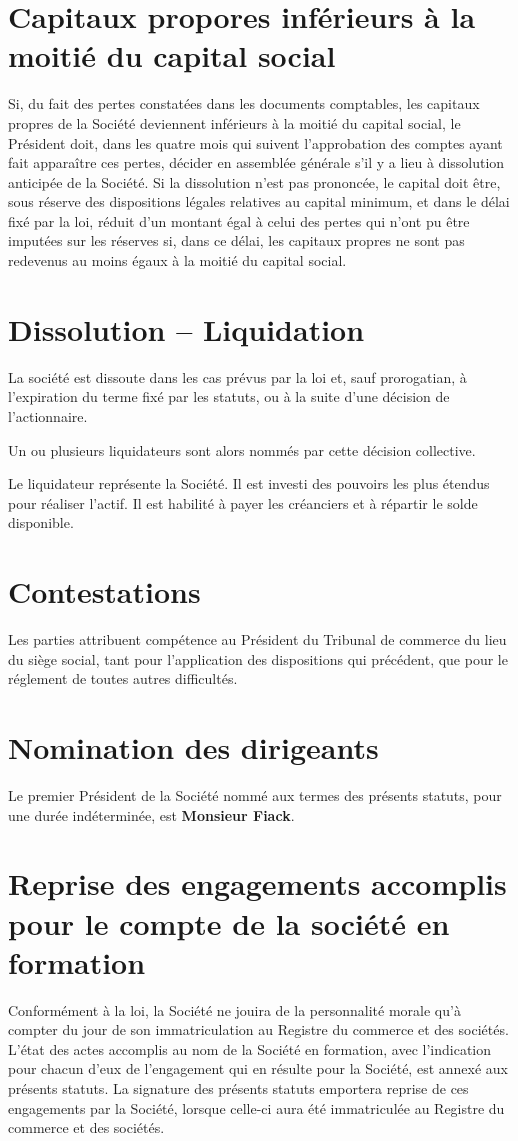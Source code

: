 \documentclass[a4paper,12pt]{report}
\begin{document}
\section{Capitaux propores inférieurs à la moitié du capital social}
Si, du fait des pertes constatées dans les documents comptables, les capitaux propres de la Société deviennent inférieurs à la moitié du capital social, 
le Président doit, dans les quatre mois qui suivent l'approbation des comptes ayant fait apparaître ces pertes, décider en assemblée générale s'il y a lieu à dissolution anticipée de la Société.
Si la dissolution n'est pas prononcée, le capital doit être, sous réserve des dispositions légales relatives au capital minimum, et dans le délai fixé par la loi, 
réduit d'un montant égal à celui des pertes qui n'ont pu être imputées sur les réserves si, dans ce délai, les capitaux propres ne sont pas redevenus au moins égaux à la moitié du capital social.

\section{Dissolution -- Liquidation}
La société est dissoute dans les cas prévus par la loi et, sauf prorogatian, à l'expiration du terme fixé par les statuts, ou à la suite d'une décision de l'actionnaire.

Un ou plusieurs liquidateurs sont alors nommés par cette décision collective.

Le liquidateur représente la Société. 
Il est investi des pouvoirs les plus étendus pour réaliser l'actif. 
Il est habilité à payer les créanciers et à répartir le solde disponible.

\section{Contestations}
Les parties attribuent compétence au Président du Tribunal de commerce du lieu du siège social, 
tant pour l'application des dispositions qui précédent, que pour le réglement de toutes autres difficultés.

\section{Nomination des dirigeants}
Le premier Président de la Société nommé aux termes des présents statuts, pour une durée indéterminée, est \textbf{Monsieur Fiack}.

\section{Reprise des engagements accomplis pour le compte de la société en formation}
Conformément à la loi, la Société ne jouira de la personnalité morale qu'à compter du jour de son immatriculation au Registre du commerce et des sociétés.
L'état des actes accomplis au nom de la Société en formation, avec l'indication pour chacun d'eux de l'engagement qui en résulte pour la Société, est annexé aux présents statuts.
La signature des présents statuts emportera reprise de ces engagements par la Société, lorsque celle-ci aura été immatriculée au Registre du commerce et des sociétés.
\end{document}
